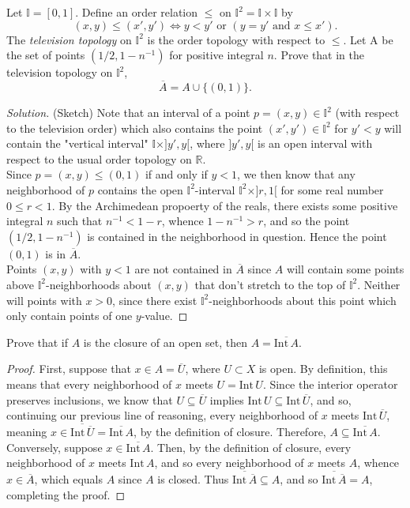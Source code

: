 \documentclass[12pt]{article}
\newenvironment{problem}[2][Problem]{\begin{trivlist}
\item[\hskip \labelsep {\bfseries #1}\hskip \labelsep {\bfseries #2.}]}{\end{trivlist}}
\newcommand{\Int}[1]{\text{Int}\,#1}
\newenvironment{solution}
  {\renewcommand\qedsymbol{$\blacksquare$}\begin{proof}[Solution]}
{\end{proof}}
\begin{document}
\begin{problem}{5}
  Let $\mathbb{I} = [0,1]$.
  Define an order relation $\leq$ on $\mathbb{I}^2 = \mathbb{I}\times\mathbb{I}$ by
  $$(x,y)\leq(x',y') \Leftrightarrow y < y' \text{ or } (y=y' \text{ and } x\leq x').$$
  \indent The \textit{television topology} on $\mathbb{I}^2$ is the order topology 
  with respect to $\leq$.
  Let A be the set of points $(1/2, 1-n^{-1})$ for positive integral $n$.
  Prove that in the television topology on $\mathbb{I}^2$,
  $$\overline{A} = A\cup\{(0,1)\}.$$
\end{problem}
\begin{solution}
  (Sketch)
  Note that an interval of a point $p=(x,y)\in\mathbb{I}^2$ 
  (with respect to the television order) which
  also contains the point $(x',y')\in\mathbb{I}^2$ for $y'<y$ will contain
  the "vertical interval" $\mathbb{I}\times ]y',y[$, where $]y',y[$
  is an open interval with respect to the usual order topology on $\mathbb{R}$.\\
  \indent Since $p=(x,y) \leq (0,1)$ if and only if $y < 1$, we then know that any neighborhood
  of $p$ contains the open $\mathbb{I}^2$-interval $\mathbb{I}^2\times]r, 1[$ for some real number
  $0\leq r < 1$.
  By the Archimedean propoerty of the reals, there exists some positive integral $n$ such that
  $n^{-1} < 1-r$, whence $1-n^{-1} > r$, and so the point $(1/2, 1-n^{-1})$ is contained in the 
    neighborhood in question.
    Hence the point $(0,1)$ is in $\overline{A}$.\\
    \indent Points $(x,y)$ with $y<1$ are not contained in $\overline{A}$ 
    since $A$ will contain some points above $\mathbb{I}^2$-neighborhoods about $(x,y)$ 
    that don't stretch to the top of $\mathbb{I}^2$.
    Neither will points with $x>0$, since there exist $\mathbb{I}^2$-neighborhoods about this point
    which only contain points of one $y$-value.
\end{solution}

\begin{problem}{7}
  Prove that if $A$ is the closure of an open set, then $A = \overline{\Int{A}}$.
\end{problem}
\begin{proof}
  First, suppose that $x\in A = \overline{U}$, where $U\subset X$ is open.
  By definition, this means that every neighborhood of $x$ meets $U = \Int{U}$.
  Since the interior operator preserves inclusions, we know that $U\subseteq\overline{U}$
  implies $\Int{U}\subseteq\Int\overline{U}$, and so, continuing our previous line of reasoning,
  every neighborhood of $x$ meets $\Int\overline{U}$, meaning 
  $x\in\overline{\Int\overline{U}}=\overline{\Int{A}}$, 
  by the definition of closure.
  Therefore, $A\subseteq\overline{\Int{A}}$.\\
  \indent Conversely, suppose $x\in\overline{\Int{A}}$.
  Then, by the definition of closure, every neighborhood of $x$ meets $\Int{A}$, and so
  every neighborhood of $x$ meets $A$, whence $x\in\overline{A}$, which equals $A$
  since $A$ is closed.
  Thus $\overline{\Int\overline{A}}\subseteq A$, and so $\overline{\Int\overline{A}}=A$,
  completing the proof.
\end{proof}
\end{document}
